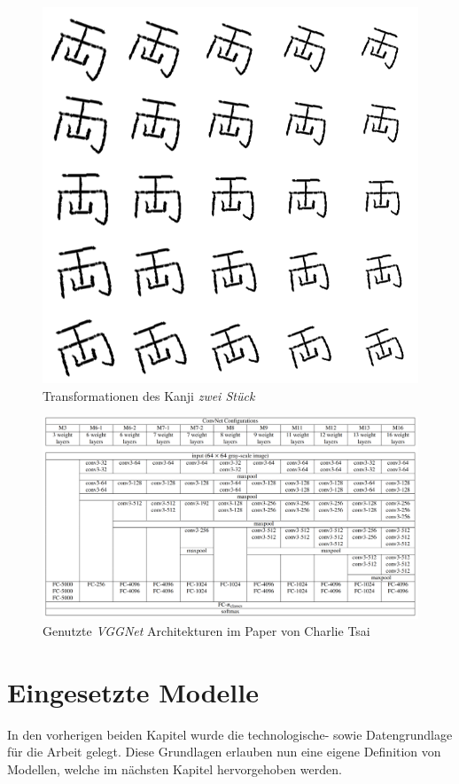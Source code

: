 \documentclass[twoside,a4paper]{IEEEtran}
\begin{document}
\begin{figure}[!htb]
	\includegraphics[width=\columnwidth]{rot_scale}
	\caption{Transformationen des Kanji \textit{zwei Stück}}
	\label{rot}
\end{figure}

\begin{figure}[!htb]
	\centering
	\includegraphics[width=2.1\columnwidth]{conv_net_architectures}
	\caption{Genutzte \emph{VGGNet} Architekturen im Paper von Charlie Tsai \cite[S.3]{RHC}}
	\label{vggnet}
\end{figure}

\section{Eingesetzte Modelle}
In den vorherigen beiden Kapitel wurde die technologische- sowie Datengrundlage für die Arbeit gelegt. Diese Grundlagen erlauben nun eine eigene Definition von Modellen, welche im nächsten Kapitel hervorgehoben werden. 
\end{document}
